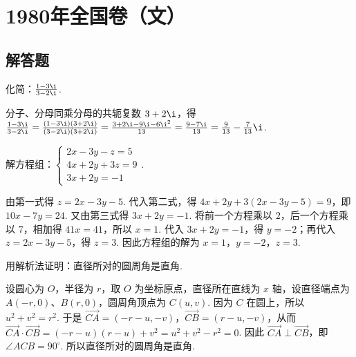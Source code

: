 \documentclass[UTF8,a4paper,oneside,11pt]{ctexbook}
\begin{document}
\mainmatter

\chapter{1980年全国卷（文）}
\section{解答题}

\begin{problem}
化简：\(\frac{1-3\i}{3-2\i}\).
\end{problem}

\begin{solution}
分子、分母同乘分母的共轭复数 \(3+2\i\)，得
\(\frac{1-3\i}{3-2\i}=\frac{(1-3\i)(3+2\i)}{(3-2\i)(3+2\i)}=\frac{3+2\i-9\i-6\i^2}{13}=\frac{9-7\i}{13}=\frac{9}{13}-\frac{7}{13}\i\).
\end{solution}

\begin{problem}
解方程组：\(\begin{cases}
2x-3y-z=5\\
4x+2y+3z=9\\
3x+2y=-1
\end{cases}\).
\end{problem}

\begin{solution}
由第一式得 \(z=2x-3y-5\). 代入第二式，得 \(4x+2y+3(2x-3y-5)=9\)，即 \(10x-7y=24\). 又由第三式得 \(3x+2y=-1\). 将前一个方程乘以 \(2\)，后一个方程乘以 \(7\)，相加得 \(41x=41\)，所以 \(x=1\). 代入 \(3x+2y=-1\)，得 \(y=-2\)；再代入 \(z=2x-3y-5\)，得 \(z=3\). 因此方程组的解为 \(x=1\)，\(y=-2\)，\(z=3\).
\end{solution}

\begin{problem}
用解析法证明：直径所对的圆周角是直角.
\end{problem}

\begin{solution}
设圆心为 \(O\)，半径为 \(r\)，取 \(O\) 为坐标原点，直径所在直线为 \(x\) 轴，设直径端点为 \(A(-r,0)\)、\(B(r,0)\)，圆周角顶点为 \(C(u,v)\). 因为 \(C\) 在圆上，所以 \(u^2+v^2=r^2\). 于是 \(\overrightarrow{CA}=(-r-u,-v)\)，\(\overrightarrow{CB}=(r-u,-v)\)，从而
\(\overrightarrow{CA}\cdot\overrightarrow{CB}=(-r-u)(r-u)+v^2=u^2+v^2-r^2=0\). 因此 \(\overrightarrow{CA}\perp\overrightarrow{CB}\)，即 \(\angle ACB=90^\circ\). 所以直径所对的圆周角是直角.
\end{solution}
\end{document}

